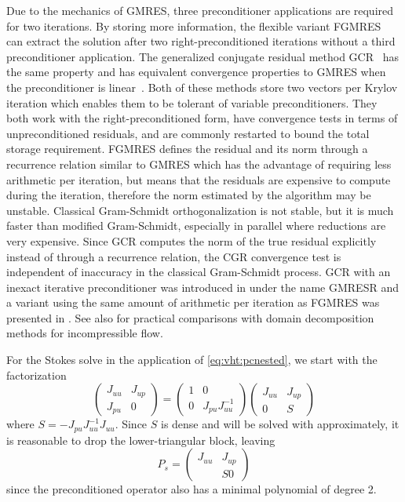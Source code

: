 Due to the mechanics of GMRES, three preconditioner applications are required for two iterations.
By storing more information, the flexible variant FGMRES~\citep{saad1993fgmres} can extract the solution after two right-preconditioned iterations without a third preconditioner application.
The generalized conjugate residual method GCR~\citep{eisenstat1983variational} has the same property and has equivalent convergence properties to GMRES when the preconditioner is linear~\cite{saad1986gmres}.
Both of these methods store two vectors per Krylov iteration which enables them to be tolerant of variable preconditioners.
They both work with the right-preconditioned form, have convergence tests in terms of unpreconditioned residuals, and are commonly restarted to bound the total storage requirement.
FGMRES defines the residual and its norm through a recurrence relation similar to GMRES which has the advantage of requiring less arithmetic per iteration, but means that the residuals are expensive to compute during the iteration, therefore the norm estimated by the algorithm may be unstable.
Classical Gram-Schmidt orthogonalization is not stable, but it is much faster than modified Gram-Schmidt, especially in parallel where reductions are very expensive.
Since GCR computes the norm of the true residual explicitly instead of through a recurrence relation, the CGR convergence test is independent of inaccuracy in the classical Gram-Schmidt process.
GCR with an inexact iterative preconditioner was introduced in \citet{vandervorst1994gmresr} under the name GMRESR and a variant using the same amount of arithmetic per iteration as FGMRES was presented in \citet{vuik1995new}.
See also \citet{brakkee1998domain} for practical comparisons with domain decomposition methods for incompressible flow.

For the Stokes solve in the application of \eqref{eq:vht:pcnested}, we start with the factorization
\begin{equation*}
  \begin{pmatrix}
    J_{uu} & J_{up} \\
    J_{pu} & 0
  \end{pmatrix} =
  \begin{pmatrix}
    1 & 0 \\ 0 & J_{pu} J_{uu}^{-1}
  \end{pmatrix}
  \begin{pmatrix}
    J_{uu} & J_{up} \\
    0 & S
  \end{pmatrix}
\end{equation*}
where $S = -J_{pu} J_{uu}^{-1}J_{uu}$.
Since $S$ is dense and will be solved with approximately, it is reasonable to drop the lower-triangular block, leaving
\begin{equation}\label{eq:vht:pcstokes}
  P_s =
  \begin{pmatrix}
    J_{uu} & J_{up} \\
    & S 0
  \end{pmatrix}
\end{equation}
since the preconditioned operator also has a minimal polynomial of degree 2.

